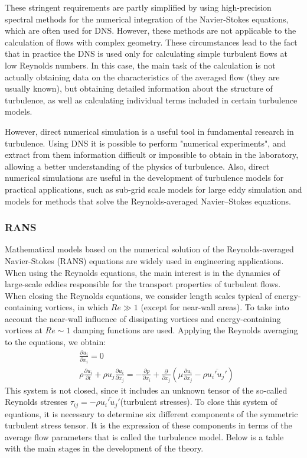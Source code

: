 	These stringent requirements are partly simplified by using high-precision spectral methods for the numerical integration of the Navier-Stokes equations, which are often used for DNS. However, these methods are not applicable to the calculation of flows with complex geometry. These circumstances lead to the fact that in practice the DNS is used only for calculating simple turbulent flows at low Reynolds numbers. In this case, the main task of the calculation is not actually obtaining data on the characteristics of the averaged flow (they are usually known), but obtaining detailed information about the structure of turbulence, as well as calculating individual terms included in certain turbulence models.
	
	However, direct numerical simulation is a useful tool in fundamental research in turbulence. Using DNS it is possible to perform "numerical experiments", and extract from them information difficult or impossible to obtain in the laboratory, allowing a better understanding of the physics of turbulence. Also, direct numerical simulations are useful in the development of turbulence models for practical applications, such as sub-grid scale models for large eddy simulation and models for methods that solve the Reynolds-averaged Navier–Stokes equations.
	
\subsubsection{RANS}
	Mathematical models based on the numerical solution of the Reynolds-averaged Navier-Stokes (RANS) equations are widely used in engineering applications. When using the Reynolds equations, the main interest is in the dynamics of large-scale eddies responsible for the transport properties of turbulent flows. When closing the Reynolds equations, we consider length scales typical of energy-containing vortices, in which $Re\gg1$ (except for near-wall areas). To take into account the near-wall influence of dissipating vortices and energy-containing vortices at $Re\sim1$ damping functions are used. Applying the Reynolds averaging to the equations, we obtain:
	\begin{align}
		&\frac{\partial u_i}{\partial x_i} = 0 \nonumber\\
		&\rho\frac{\partial u_i}{\partial t} + \rho u_j \frac{\partial u_i}{\partial x_j} = - \frac{\partial p}{\partial x_i} + \frac{\partial}{\partial x_j}(\mu\frac{\partial u_i}{\partial x_j} - \rho\overline{u_i' u_j'})
	\end{align}
	This system is not closed, since it includes an unknown tensor of the so-called Reynolds stresses $\tau_{ij} = -\rho\overline{u_i' u_j'}$(turbulent stresses). To close this system of equations, it is necessary to determine six different components of the symmetric turbulent stress tensor. It is the expression of these components in terms of the average flow parameters that is called the turbulence model. Below is a table with the main stages in the development of the theory.
	

